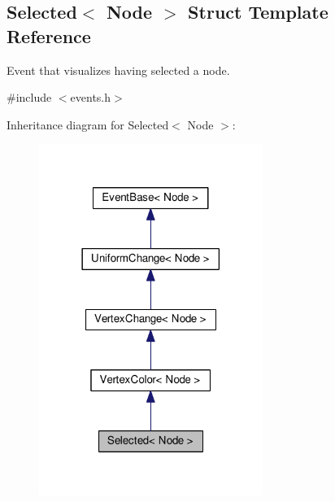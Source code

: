 \hypertarget{structSelected}{}\subsection{Selected$<$ Node $>$ Struct Template Reference}
\label{structSelected}


Event that visualizes having selected a node.  




{\ttfamily \#include $<$events.\+h$>$}



Inheritance diagram for Selected$<$ Node $>$\+:\nopagebreak
\begin{figure}[H]
\begin{center}
\leavevmode
\includegraphics[width=206pt]{structSelected__inherit__graph}
\end{center}
\end{figure}


